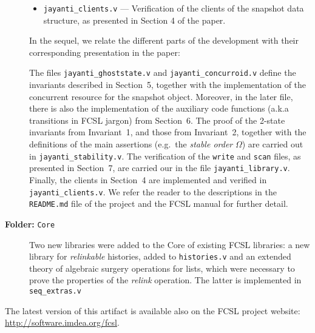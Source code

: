 \documentclass[a4paper,USenglish]{darts}
\begin{document}
\begin{content}
\begin{description}
\begin{itemize}
 \item \texttt{jayanti\_clients.v} --- Verification of the clients of
   the snapshot data structure, as presented in Section 4 of the
   paper.
\end{itemize}

In the sequel, we relate the different parts of the development with
their corresponding presentation in the paper:

The files \texttt{jayanti\_ghoststate.v} and
\texttt{jayanti\_concurroid.v} define the invariants described in
Section~5, together with the implementation of the concurrent resource
for the snapshot object. Moreover, in the later file, there is also
the implementation of the auxiliary code functions (a.k.a transitions
in FCSL jargon) from Section~6. The proof of the 2-state invariants
from Invariant~1, and those from Invariant~2, together with the
definitions of the main assertions (e.g.\ the {\it stable order}
$\Omega$) are carried out in \texttt{jayanti\_stability.v}. The
verification of the \texttt{write} and \texttt{scan} files, as
presented in Section~7, are carried our in the file
\texttt{jayanti\_library.v}. Finally, the clients in Section~4 are
implemented and verified in \texttt{jayanti\_clients.v}. We refer the
reader to the descriptions in the \texttt{README.md} file of the
project and the FCSL manual for further detail.

  \item [{\bf \large Folder:} \texttt{Core}] Two new libraries were
    added to the Core of existing FCSL libraries: a new library for
    {\it relinkable} histories, added to \texttt{histories.v} and an
    extended theory of algebraic surgery operations for lists, which
    were necessary to prove the properties of the {\it relink}
    operation. The latter is implemented in \texttt{seq\_extras.v}
\end{description}
\end{content} 

\begin{getting}
  The latest version of this artifact is available also on the FCSL
  project website: \url{http://software.imdea.org/fcsl}.
\end{getting} 
\end{document}

